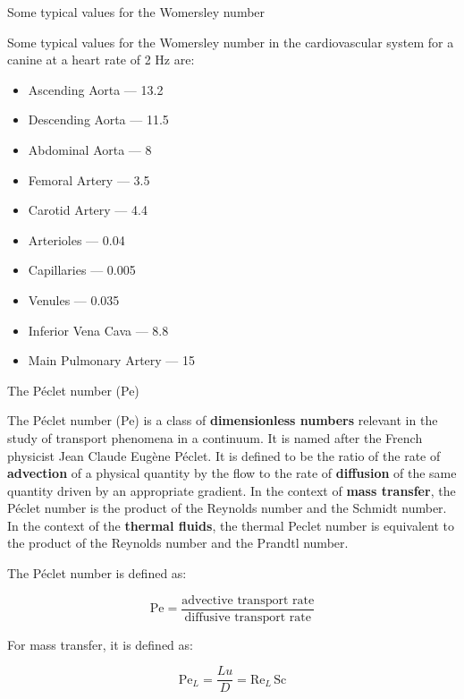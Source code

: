 \documentclass{beamer}
\begin{document}
\begin{frame}{Some typical values for the Womersley number}

Some typical values for the Womersley number in the cardiovascular system for a canine at a heart rate of 2 Hz are:

\begin{itemize}
    \item Ascending Aorta — 13.2
    \item Descending Aorta — 11.5
    \item Abdominal Aorta — 8
    \item Femoral Artery — 3.5
    \item Carotid Artery — 4.4
    \item Arterioles — 0.04
    \item Capillaries — 0.005
    \item Venules — 0.035
    \item Inferior Vena Cava — 8.8
    \item Main Pulmonary Artery — 15
\end{itemize}

\end{frame}

\begin{frame}{The Péclet number (Pe)}

The Péclet number (Pe) is a class of \textbf{dimensionless numbers} relevant in the study of transport phenomena in a continuum. It is named after the French physicist Jean Claude Eugène Péclet. It is defined to be the ratio of the rate of \textbf{advection} of a physical quantity by the flow to the rate of \textbf{diffusion} of the same quantity driven by an appropriate gradient. In the context of \textbf{mass transfer}, the Péclet number is the product of the Reynolds number and the Schmidt number. In the context of the \textbf{thermal fluids}, the thermal Peclet number is equivalent to the product of the Reynolds number and the Prandtl number.

\medskip

The Péclet number is defined as:

\begin{equation*}
\text{Pe} = \frac{\text{advective transport rate}}{\text{diffusive transport rate}}
\end{equation*}

\medskip

For mass transfer, it is defined as:

\begin{equation*}
\text{Pe}_L = \frac{Lu}{D} = \text{Re}_L \, \text{Sc}
\end{equation*}

\end{frame}
\end{document}
